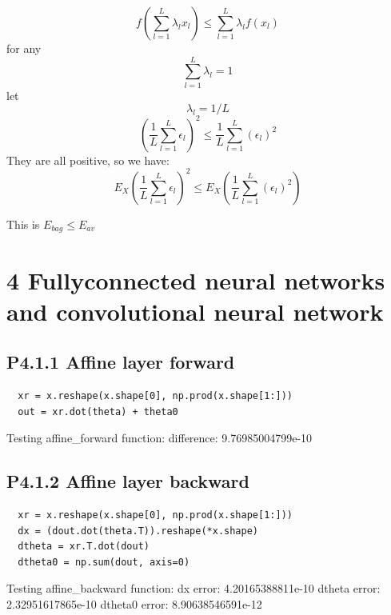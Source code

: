 \documentclass[12pt]{article}
\begin{document}
\begin{itemize}
\begin{equation}
f({\displaystyle \sum_{l=1}^{L}}\lambda_{l}x_{l})\leq{\displaystyle \sum_{l=1}^{L}}\lambda_{l}f(x_{l}) 
\end{equation}
for any
\begin{equation}
\sum_{l=1}^{L}\lambda_{l}=1 
\end{equation}
let 
\begin{equation}
\lambda_{l}=1/L
\end{equation}
\begin{equation}
(\frac{1}{L}{\displaystyle \sum_{l=1}^{L}}\epsilon_{l})^{2}\leq{\displaystyle \frac{1}{L}\sum_{l=1}^{L}}(\epsilon_{l})^{2}
\end{equation}
They are all positive, so we have:
\begin{equation}
E_{X}(\frac{1}{L}{\displaystyle \sum_{l=1}^{L}}\epsilon_{l})^{2}\leq E_{X}({\displaystyle \frac{1}{L}\sum_{l=1}^{L}}(\epsilon_{l})^{2}) 
\end{equation}

This is  $E_{bag}\leq E_{av}$






\end{itemize}


\section*{4 Fullyconnected neural networks and convolutional neural network}
\subsection*{P4.1.1 Affine layer forward}
\begin{lstlisting}
  xr = x.reshape(x.shape[0], np.prod(x.shape[1:]))
  out = xr.dot(theta) + theta0
\end{lstlisting}
Testing affine\_forward function:
difference:  9.76985004799e-10



\subsection*{P4.1.2 Affine layer backward}
\begin{lstlisting}
  xr = x.reshape(x.shape[0], np.prod(x.shape[1:]))
  dx = (dout.dot(theta.T)).reshape(*x.shape)
  dtheta = xr.T.dot(dout)
  dtheta0 = np.sum(dout, axis=0)
\end{lstlisting}
Testing affine\_backward function:
dx error:  4.20165388811e-10
dtheta error:  2.32951617865e-10
dtheta0 error:  8.90638546591e-12
\end{document}
